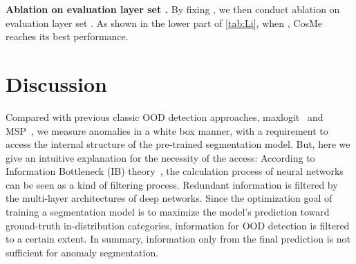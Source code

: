 \documentclass[10pt,twocolumn,letterpaper]{article}
\begin{document}
\begin{table}[t!]
  \centering
  \caption{Ablation results for the selection of  (upper part) and  (lower part).}
  \label{tab:Li}
  \vspace{-4mm}
\end{table}


\noindent \textbf{Ablation on evaluation layer set .}  By fixing , we then conduct ablation on evaluation layer set . As shown in the lower part of \cref{tab:Li}, when , CosMe reaches its best performance.












\section{Discussion}
Compared with previous classic OOD detection approaches, maxlogit~\cite{streethazards} and MSP~\cite{MSP}, we measure anomalies in a white box manner, with a requirement to access the internal structure of the pre-trained segmentation model. But, here we give an intuitive explanation for the necessity of the access: According to Information Bottleneck (IB) theory~\cite{infobott}, the calculation process of neural networks can be seen as a kind of filtering process. Redundant information is filtered by the multi-layer architectures of deep networks. Since the optimization goal of training a segmentation model is to maximize the model's prediction toward ground-truth in-distribution categories, information for OOD detection is filtered to a certain extent. In summary, information only from the final prediction is not sufficient for anomaly segmentation.
\end{document}
